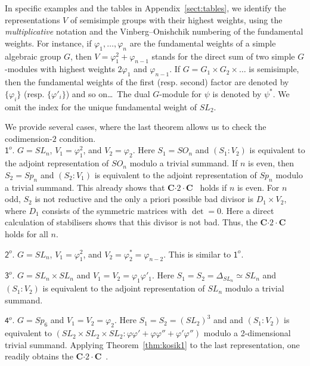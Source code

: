 \begin{Not}   \label{notation-phi}
In specific examples and the tables in Appendix~\ref{sect:tables}, 
we identify the representations $V$ of semisimple groups with their highest weights, using the {\it multiplicative\/} notation and the
Vinberg--Onishchik numbering of the fundamental weights. For instance, if ${\varphi}_1,\dots,{\varphi}_n$ are the fundamental weights of a simple algebraic group $G$, then $V={\varphi}_1^2+{\varphi}_{n-1}$ stands for the direct sum of two simple $G$-modules with highest weights $2{\varphi}_1$ and ${\varphi}_{n-1}$. If $G=G_1\times G_2\times\ldots$ is semisimple, then the fundamental weights of the first (resp. second) factor are denoted by $\{ {\varphi}_i\}$ (resp. $\{ {\varphi}'_i\}$) and so on\dots \ The dual $G$-module for $\psi$ is denoted by $\psi^*$.
We omit the index for the unique fundamental weight of $SL_2$.
\end{Not}

\begin{ex}    \label{ex:kosik1}
We provide several cases, where the last theorem allows us to check the 
{codimension}-$2$ condition.
\\ \indent 
${\mathsf 1^o}$.  $G=SL_n$, $V_1={\varphi}_1^2$, and $V_2={\varphi}_2$. Here $S_1=SO_n$ and 
$(S_1:V_2)$ is equivalent to the adjoint representation of $SO_n$ modulo a trivial summand.
If $n$ is even, then $S_2=Sp_{n}$ and $(S_2:V_1)$ is equivalent to the adjoint representation of 
$Sp_n$ modulo a trivial summand. This already shows that {\textsf{\bfseries C${\cdot}2{\cdot}$C}\ } holds if $n$ is even. 
For $n$ odd, $S_2$ is not reductive and the only {\sf a priori} possible bad divisor is $D_1\times V_2$, where $D_1$ consists of the symmetric matrices with $\det=0$. Here a direct calculation of stabilisers shows that this divisor is not bad. Thus, the 
{\textsf{\bfseries C${\cdot}2{\cdot}$C}\ } holds for all $n$.

${\mathsf 2^o}$.  $G=SL_n$, $V_1={\varphi}_1^2$, and $V_2={\varphi}_2^*={\varphi}_{n-2}$. This is similar to ${\mathsf 1^o}$.

${\mathsf 3^o}$.  $G=SL_n\times SL_n$ and $V_1=V_2={\varphi}_1{\varphi}'_1$. Here $S_1=S_2=\Delta_{SL_n}\simeq SL_n$
and $(S_1: V_2)$ is equivalent to the adjoint representation of $SL_n$ modulo a trivial summand.

${\mathsf 4^o}$.  $G=Sp_6$ and $V_1=V_2={\varphi}_2$. Here $S_1=S_2=(SL_2)^3$ and 
and $(S_1: V_2)$ is equivalent to $(SL_2\times SL_2\times SL_2: {\varphi}{\varphi}'+{\varphi}{\varphi}''+{\varphi}'{\varphi}'')$
 modulo a 2-dimensional trivial summand. Applying Theorem~\ref{thm:kosik1} to the last representation, one readily obtains the {\textsf{\bfseries C${\cdot}2{\cdot}$C}\ }.
\end{ex}


